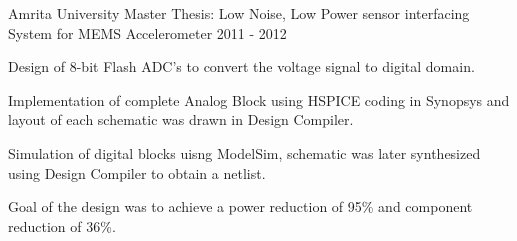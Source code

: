 

\begin{cventries}

  \cventry
    {Amrita University} %
    {Master Thesis: Low Noise, Low Power sensor interfacing System for MEMS Accelerometer} %
    {} %
    {2011 - 2012} %
    {
      \begin{cvitems} %
        \item {Design of 8-bit Flash ADC's to convert the voltage signal to digital domain.}
        \item {Implementation of complete Analog Block using HSPICE coding in Synopsys and layout of each schematic was drawn in Design Compiler.}
        \item {Simulation of digital blocks uisng ModelSim, schematic was later synthesized using Design Compiler to obtain a netlist.}
        \item {Goal of the design was to achieve a power reduction of 95\% and component reduction of 36\%.}
      \end{cvitems}
    }
    
\end{cventries}
